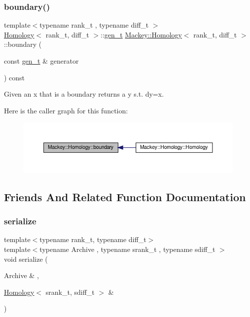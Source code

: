 \subsubsection{\texorpdfstring{boundary()}{boundary()}}
{\footnotesize\ttfamily template$<$typename rank\+\_\+t , typename diff\+\_\+t $>$ \\
\hyperlink{classMackey_1_1Homology}{Homology}$<$ rank\+\_\+t, diff\+\_\+t $>$\+::\hyperlink{classMackey_1_1Homology_adf81f4293a5feba94aa734fcc8c89a46}{gen\+\_\+t} \hyperlink{classMackey_1_1Homology}{Mackey\+::\+Homology}$<$ rank\+\_\+t, diff\+\_\+t $>$\+::boundary (\begin{DoxyParamCaption}\item[{const \hyperlink{classMackey_1_1Homology_adf81f4293a5feba94aa734fcc8c89a46}{gen\+\_\+t} \&}]{generator }\end{DoxyParamCaption}) const}



Given an x that is a boundary returns a y s.\+t. dy=x. 

Here is the caller graph for this function\+:\nopagebreak
\begin{figure}[H]
\begin{center}
\leavevmode
\includegraphics[width=350pt]{classMackey_1_1Homology_aeb3cbf5cc7cb166e8e0a552dda57d05b_icgraph}
\end{center}
\end{figure}


\subsection{Friends And Related Function Documentation}
\mbox{\label{classMackey_1_1Homology_afe2aae7d5b96af426bfe7a7898459cb6}} 
\subsubsection{\texorpdfstring{serialize}{serialize}}
{\footnotesize\ttfamily template$<$typename rank\+\_\+t, typename diff\+\_\+t$>$ \\
template$<$typename Archive , typename srank\+\_\+t , typename sdiff\+\_\+t $>$ \\
void serialize (\begin{DoxyParamCaption}\item[{Archive \&}]{,  }\item[{\hyperlink{classMackey_1_1Homology}{Homology}$<$ srank\+\_\+t, sdiff\+\_\+t $>$ \&}]{ }\end{DoxyParamCaption})\hspace{0.3cm}{\ttfamily [friend]}}



